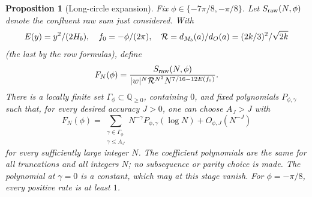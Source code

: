 \documentclass[11pt]{article}
\numberwithin{equation}{section}
\newtheorem{proposition}[theorem]{Proposition}
\theoremstyle{definition}\newtheorem{definition}[theorem]{Definition}
\theoremstyle{remark}\newtheorem{remark}[theorem]{Remark}
\begin{document}
\begin{proposition}[Long-circle expansion]\label{L:prop:long-circle}
Fix $\phi\in\{-7\pi/8,-\pi/8\}$. Let \(S_{\rm raw}(N,\phi)\) denote the confluent raw sum just considered. With
\[
 E(y)=y^2/(2H_b),\quad f_0=-\phi/(2\pi),\quad
 {\cal R}=d_{M_b}(a)/d_O(a)=(2k/3)^2/\sqrt{2k}
\]
(the last by the row formulas), define
\[
 F_N(\phi)=
 \frac{S_{\rm raw}(N,\phi)}
 {|w|^N{\cal R}^{N^2}N^{7/16-12E(f_0)}}.
\]
There is a locally finite set \(\Gamma_\phi\subset\mathbb Q_{\ge0}\),
containing \(0\), and fixed polynomials \(P_{\phi,\gamma}\) such that,
for every desired accuracy \(J>0\), one can choose \(A_J>J\) with
\[
 F_N(\phi)=
 \sum_{\substack{\gamma\in\Gamma_\phi\\ \gamma\le A_J}}
 N^{-\gamma}P_{\phi,\gamma}(\log N)+O_{\phi,J}(N^{-J})
\]
for every sufficiently large integer \(N\). The coefficient polynomials
are the same for all truncations and all integers \(N\); no subsequence
or parity choice is made. The polynomial at \(\gamma=0\) is a constant,
which may at this stage vanish. For \(\phi=-\pi/8\), every positive rate
is at least \(1\).

\end{proposition}
\end{document}
